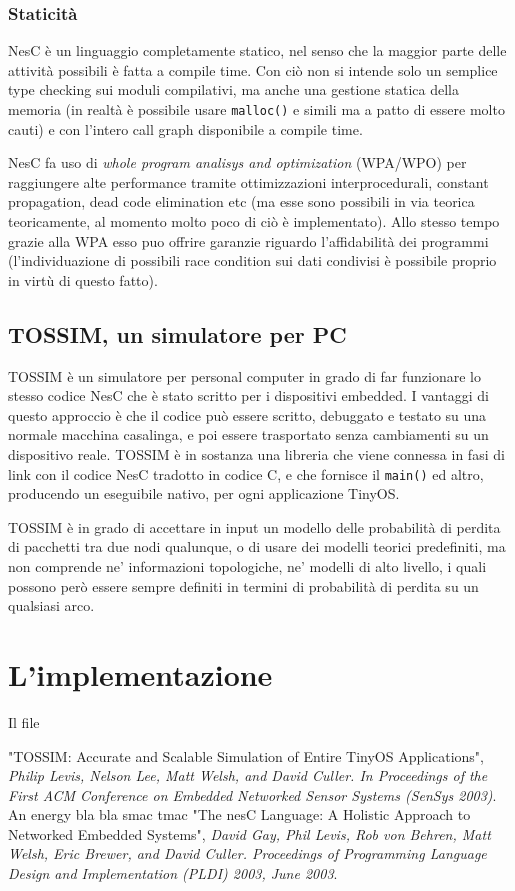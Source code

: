 \documentclass[pdftex,12pt,a4paper,italian,openany]{book}
\begin{document}
\subsection{Staticità}

NesC è un linguaggio completamente statico, nel senso che la maggior parte delle attività 
possibili è fatta a compile time. Con ciò non si intende solo un semplice type checking sui 
moduli compilativi, ma anche una gestione statica della memoria (in realtà è possibile usare 
\texttt{malloc()} e simili ma a patto di essere molto cauti) e con l'intero call graph disponibile a compile time. 

NesC fa uso di \emph{whole program analisys and optimization} (WPA/WPO) per raggiungere alte
performance tramite ottimizzazioni interprocedurali, constant propagation, dead code 
elimination etc (ma esse sono possibili in via teorica teoricamente, al momento molto poco 
di ciò è implementato).
Allo stesso tempo grazie alla WPA esso puo offrire garanzie riguardo l'affidabilità dei 
programmi (l'individuazione di possibili race condition sui dati condivisi è possibile proprio 
in virtù di questo fatto).


\section{TOSSIM, un simulatore per PC}
TOSSIM\cite{TOSSIM} è un simulatore per personal computer  in grado di far funzionare lo 
stesso codice NesC che è stato scritto per i dispositivi embedded. 
I vantaggi di questo approccio è che il codice può essere scritto, debuggato e testato su 
una normale macchina casalinga, e poi essere trasportato senza cambiamenti su un dispositivo 
reale. 
TOSSIM è in sostanza una libreria che viene connessa in fasi di link con il codice NesC 
tradotto in codice C, e che fornisce il \texttt{main()} ed altro, producendo un 
eseguibile nativo, per ogni applicazione TinyOS.

TOSSIM è in grado di accettare in input un modello delle probabilità di perdita di pacchetti 
tra due nodi qualunque, o di usare dei modelli teorici predefiniti, ma non comprende ne' 
informazioni topologiche, ne' modelli di alto livello, i quali possono però essere sempre 
definiti in termini di probabilità di perdita su un qualsiasi arco. 

\chapter{L'implementazione}
Il file 


\begin{thebibliography}{99}
 "TOSSIM: Accurate and Scalable Simulation of Entire TinyOS Applications", \emph{Philip Levis, Nelson Lee, Matt Welsh, and David Culler. In Proceedings of the First ACM Conference on Embedded Networked Sensor Systems (SenSys 2003)}.  
 An energy bla bla
 smac
 tmac
 "The nesC Language: A Holistic Approach to Networked Embedded Systems", \emph{David Gay, Phil Levis, Rob von Behren, Matt Welsh, Eric Brewer, and David Culler. Proceedings of Programming Language Design and Implementation (PLDI) 2003, June 2003}.
\end{thebibliography}
\end{document}
